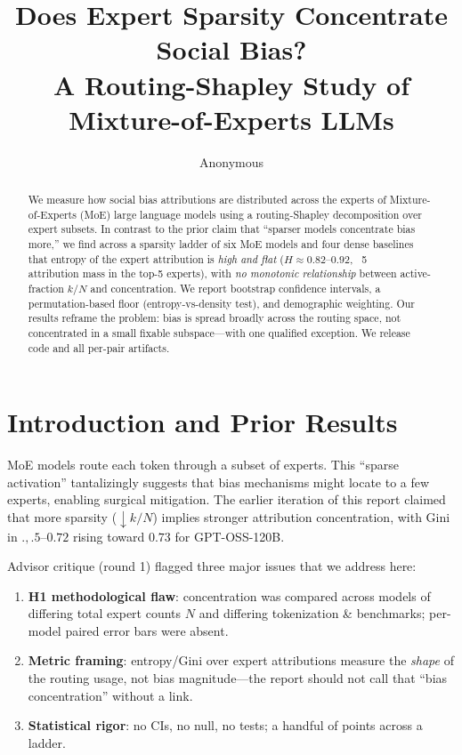 \documentclass[sigconf]{acmart}
\begin{document}
\title{Does Expert Sparsity Concentrate Social Bias?\\
  A Routing-Shapley Study of Mixture-of-Experts LLMs}

\author{Anonymous}
\affiliation{}
\email{}

\graphicspath{{../stats_analysis/figures/}}

\begin{abstract}
We measure how social bias attributions are distributed across the experts of
Mixture-of-Experts (MoE) large language models using a routing-Shapley
decomposition over expert subsets.  In contrast to the prior claim that
``sparser models concentrate bias more,'' we find across a sparsity ladder of
six MoE models and four dense baselines that entropy of the expert
attribution is \emph{high and flat} ($H\approx0.82$--$0.92$, ~5\\%
attribution mass in the top-5 experts), with \emph{no monotonic relationship}
between active-fraction $k/N$ and concentration.  We report bootstrap
confidence intervals, a permutation-based floor (entropy-vs-density test), and
demographic weighting.  Our results reframe the problem: bias is spread
broadly across the routing space, not concentrated in a small fixable
subspace---with one qualified exception.  We release code and all per-pair
artifacts.
\end{abstract}


\maketitle

\section{Introduction and Prior Results}

MoE models route each token through a subset of experts. This ``sparse
activation'' tantalizingly suggests that bias mechanisms might locate to a few
experts, enabling surgical mitigation. The earlier iteration of this report
claimed that more sparsity ($\downarrow k/N$) implies stronger attribution
concentration, with Gini in $.,.5$--$0.72$ rising toward $0.73$ for
GPT-OSS-120B.

Advisor critique (round 1) flagged three major issues that we address here:
\begin{enumerate}
\item \textbf{H1 methodological flaw}: concentration was compared across
models of differing total expert counts $N$ and differing tokenization &
benchmarks; per-model paired error bars were absent.
\item \textbf{Metric framing}: entropy/Gini over expert attributions measure
the \emph{shape} of the routing usage, not bias magnitude---the report should
not call that ``bias concentration'' without a link.
\item \textbf{Statistical rigor}: no CIs, no null, no tests; a handful of
points across a ladder.
\end{enumerate}
\end{document}
